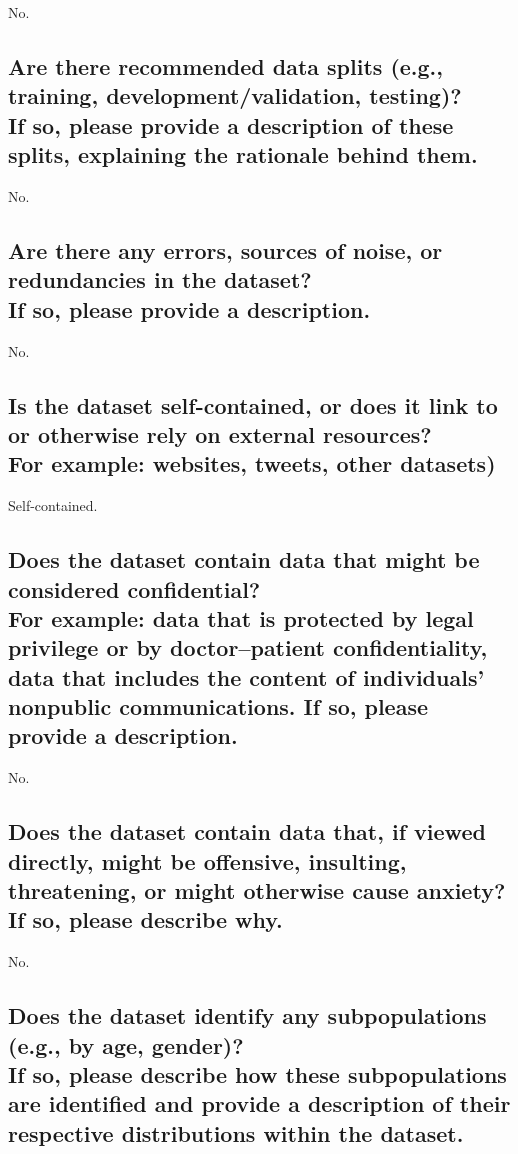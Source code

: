 \documentclass[letterpaper, 10 pt, conference]{ieeeconf}  %
\newcommand{\subtitle}[1]{{\\ \small \normalfont \color{purple} #1}}
\begin{document}
No.

\subsection{Are there recommended data splits (e.g., training, development/validation, testing)? \subtitle{If so, please provide a description of these splits, explaining the rationale behind them.}}

No.

\subsection{Are there any errors, sources of noise, or redundancies in the dataset? \subtitle{If so, please provide a description.}}

No.

\subsection{Is the dataset self-contained, or does it link to or otherwise rely on external resources? \subtitle{For example: websites, tweets, other datasets)}}

Self-contained.

\subsection{Does the dataset contain data that might be considered confidential? \subtitle{For example: data that is protected by legal privilege or by doctor–patient confidentiality, data that includes the content of individuals’ nonpublic communications. If so, please provide a description.}}

No.

\subsection{Does the dataset contain data that, if viewed directly, might be offensive, insulting, threatening, or might otherwise cause anxiety? \subtitle{If so, please describe why.}}

No.

\subsection{Does the dataset identify any subpopulations (e.g., by age, gender)? \subtitle{If so, please describe how these subpopulations are identified and provide a description of their respective distributions within the dataset.}}
\end{document}
